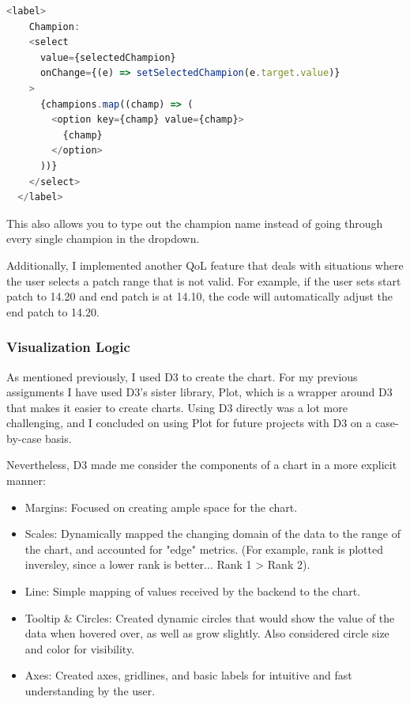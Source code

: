 \documentclass{article}
\begin{document}
\begin{lstlisting}[language=JavaScript]
  <label>
    Champion:
    <select
      value={selectedChampion}
      onChange={(e) => setSelectedChampion(e.target.value)}
    >
      {champions.map((champ) => (
        <option key={champ} value={champ}>
          {champ}
        </option>
      ))}
    </select>
  </label>
\end{lstlisting}

This also allows you to type out the champion name 
instead of going through every single champion in the dropdown.

Additionally, I implemented another QoL feature that deals with situations
where the user selects a patch range that is not valid. 
For example, if the user sets start patch to 14.20 and end patch is at 14.10,
the code will automatically adjust the end patch to 14.20.

\subsubsection{Visualization Logic}
\label{subsubsec:Visualization Logic}

As mentioned previously, I used D3 to create the chart. For my previous 
assignments I have used D3's sister library, Plot, which 
is a wrapper around D3 that makes it easier to create charts. 
Using D3 directly was a lot more challenging, and I concluded on using
Plot for future projects with D3 on a case-by-case basis.

Nevertheless, D3 made me consider the components of a chart in a more
explicit manner:
\begin{itemize}
  \item Margins: Focused on creating ample space for the chart.
  \item Scales: Dynamically mapped the changing domain of the data to the range of the chart, 
        and accounted for "edge" metrics. (For example, rank is plotted inversley, since
        a lower rank is better... Rank 1 > Rank 2).
  \item Line: Simple mapping of values received by the backend to the chart.
  \item Tooltip \& Circles: Created dynamic circles that would show the value of the data
        when hovered over, as well as grow slightly. Also considered circle size and color 
        for visibility.
  \item Axes: Created axes, gridlines, and basic labels for 
  intuitive and fast understanding by the user.
\end{itemize}
\end{document}
